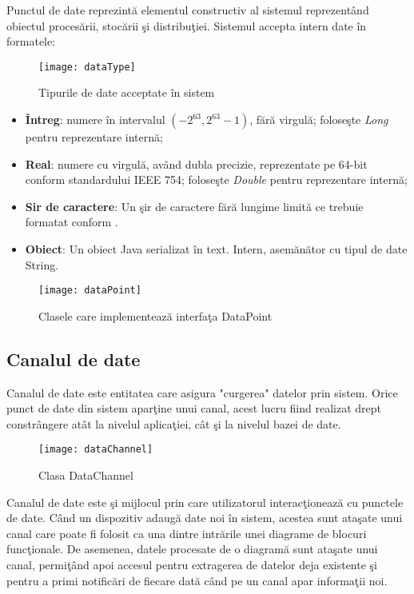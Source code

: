 Punctul de date reprezintă elementul constructiv al sistemul reprezentând obiectul procesării, stocării şi distribuţiei. 
Sistemul accepta intern date în formatele: 
\begin{wrapfigure}{r}{0.38\textwidth}
	\centering
	\texttt{[image: dataType]}
	\caption{Tipurile de date acceptate în sistem}
\end{wrapfigure}
\begin{itemize}
	\item \textbf{Întreg}: numere în intervalul $(-2^{63}, 2^{63} -1)$, fără virgulă; foloseşte \textit{Long} pentru reprezentare internă;
	\item \textbf{Real}: numere cu virgulă, având dubla precizie, reprezentate pe 64-bit conform standardului \autocite{4610935} IEEE 754;  foloseşte \textit{Double} pentru reprezentare internă;
	\item \textbf{Sir de caractere}: Un şir de caractere fără lungime limită ce trebuie formatat conform \autocite{rfc4627}. 
	\item \textbf{Obiect}: Un obiect Java serializat în text. Intern, asemănător cu tipul de date String. 
\end{itemize}

\begin{figure}[h]
	\centering
	\texttt{[image: dataPoint]}
	\caption{Clasele care implementează interfaţa DataPoint}
\end{figure}

\subsection{Canalul de date}

Canalul de date este entitatea care asigura "curgerea" datelor prin sistem. Orice punct de date din sistem aparţine unui canal, acest lucru fiind realizat drept constrângere atât la nivelul aplicaţiei, cât şi la nivelul bazei de date.
\begin{figure}[h]
	\centering
	\texttt{[image: dataChannel]}
	\caption{Clasa DataChannel}
\end{figure}

Canalul de date este şi mijlocul prin care utilizatorul interacţionează cu punctele de date. Când un dispozitiv adaugă date noi în sistem, acestea sunt ataşate unui canal  care poate fi folosit ca una dintre intrările unei diagrame de blocuri funcţionale. De asemenea, datele procesate de o diagramă sunt ataşate unui canal, permiţând apoi accesul pentru extragerea de datelor deja existente şi pentru a primi notificări de fiecare dată când pe un canal apar informaţii noi.

